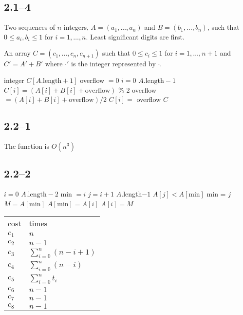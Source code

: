 \subsection*{2.1--4}

\begin{inp}
	Two sequences of $n$ integers, $A=(a_{1},\ldots,a_{n})$ and $B=(b_{1},\ldots,b_{n})$, such that $0\leq a_{i},b_{i}\leq 1$ for $i=1,\ldots,n$. Least significant digits are first.
\end{inp}

\begin{outp}
	An array $C=(c_{1},\ldots,c_{n},c_{n+1})$ such that $0\leq c_{i}\leq 1$ for $i=1,\ldots,n+1$ and $C'=A'+B'$ where $\cdot'$ is the integer represented by $\cdot$.
\end{outp}

\begin{codebox}
	\li \Define integer $C[A.\text{length}+1]$
	\li overflow $=0$
	\li	\For $i = 0$ \To $A.\text{length}-1$
	\li \Do
				$C[i] = (A[i] + B[i] + \text{overflow})$ \% $2$
	\li		overflow $= (A[i] + B[i] + \text{overflow})/2$
			\End
	\li $C[i] =$ overflow
	\li \Return $C$
\end{codebox}

\subsection*{2.2--1}

The function is $O(n^{3})$

\subsection*{2.2--2}

\begin{multicols}{2}
	\begin{codebox}
		\li	\For $i = 0$ \To $A.\text{length}-2$
		\li	\Do
					min $= i$
		\li		\For $j = i+1$ \To $A.$length$-1$
		\li		\Do
						\If $A[j] < A[\text{min}]$
		\li			\Then
							min = $j$
						\End
					\End
		\li $M = A[\text{min}]$
		\li $A[\text{min}] = A[i]$
		\li $A[i] = M$
					\End
		\end{codebox}
		\columnbreak
		\begin{tabular}{ l l }
			cost & times\\[4pt]
			$c_{1}$ & $n$\\
			$c_{2}$ & $n-1$\\
			$c_{3}$ & $\sum_{i=0}^{n}(n-i+1)$\\
			$c_{4}$ & $\sum_{i=0}^{n}(n-i)$\\
			$c_{5}$ & $\sum_{i=0}^{n}t_{i}$\\
			$c_{6}$ & $n-1$\\
			$c_{7}$ & $n-1$\\
			$c_{8}$ & $n-1$
		\end{tabular}
\end{multicols}

